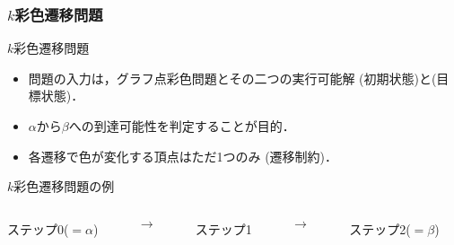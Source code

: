 \documentclass[dvipdfmx,11pt]{beamer}
\begin{document}
\begin{frame}\frametitle{$k$彩色遷移問題}

  \begin{block}{$k$彩色遷移問題}
    \begin{itemize}
    \item 問題の入力は，グラフ点彩色問題とその二つの実行可能解
      \structure{$\alpha$}(初期状態)と\structure{$\beta$}(目標状態)．
    \item $\alpha$から$\beta$への到達可能性を判定することが目的．
    \item 各遷移で色が変化する頂点はただ1つのみ (遷移制約)．
    \end{itemize}
  \end{block}

  \begin{exampleblock}{$k$彩色遷移問題の例}
    \begin{columns}
      \begin{column}{0.3\textwidth}
        \centering
        
        ステップ0($=\alpha$)
      \end{column}
      \begin{column}{0.05\textwidth}
        \textbf{$\longrightarrow$}
      \end{column}
      \begin{column}[]{0.3\textwidth}
        \centering
        
        ステップ1
      \end{column}
      \begin{column}{0.05\textwidth}
        \textbf{$\longrightarrow$}
      \end{column}
      \begin{column}{0.3\textwidth}
        \centering
        
        ステップ2($=\beta$)
      \end{column}
    \end{columns}
  \end{exampleblock}
  
\end{frame}
\end{document}
